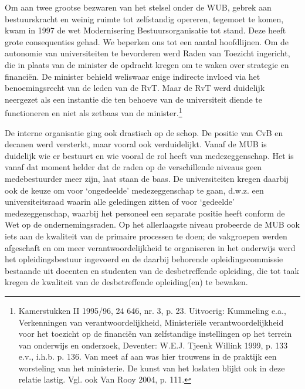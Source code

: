 \documentclass[smallauthor, chapterhaspagenum, nochapterinheader, pagenuminheader,  bigchapnum,medium2, tocpages,  garamond, titleinheader]{jote-book}
\begin{document}
	Om aan twee grootse bezwaren van het stelsel onder de WUB, gebrek aan bestuurskracht en weinig ruimte tot zelfstandig opereren, tegemoet te komen, kwam in 1997 de wet Modernisering Bestuursorganisatie tot stand. Deze heeft grote consequenties gehad. We beperken ons tot een aantal hoofdlijnen. Om de autonomie van universiteiten te bevorderen werd Raden van Toezicht ingericht, die in plaats van de minister de opdracht kregen om te waken over strategie en financiën. De minister behield weliswaar enige indirecte invloed via het benoemingsrecht van de leden van de RvT. Maar de RvT werd duidelijk neergezet als een instantie die ten behoeve van de universiteit diende te functioneren en niet als zetbaas van de minister.\footnote{Kamerstukken II 1995/96, 24 646, nr. 3, p. 23. Uitvoerig: Kummeling e.a., Verkenningen van verantwoordelijkheid, Ministeriële verantwoordelijkheid voor het toezicht op de financiën van zelfstandige instellingen op het terrein van onderwijs en onderzoek, Deventer: W.E.J. Tjeenk Willink 1999, p. 133 e.v., i.h.b. p. 136. Van meet af aan was hier trouwens in de praktijk een worsteling van het ministerie. De kunst van het loslaten blijkt ook in deze relatie lastig. Vgl. ook Van Rooy 2004, p. 111. }



	De interne organisatie ging ook drastisch op de schop. De positie van CvB en decanen werd versterkt, maar vooral ook verduidelijkt. Vanaf de MUB is duidelijk wie er bestuurt en wie vooral de rol heeft van medezeggenschap. Het is vanaf dat moment helder dat de raden op de verschillende niveaus geen medebestuurder meer zijn, laat staan de baas. De universiteiten kregen daarbij ook de keuze om voor ‘ongedeelde' medezeggenschap te gaan, d.w.z. een universiteitsraad waarin alle geledingen zitten of voor ‘gedeelde' medezeggenschap, waarbij het personeel een separate positie heeft conform de Wet op de ondernemingsraden. Op het allerlaagste niveau probeerde de MUB ook iets aan de kwaliteit van de primaire processen te doen; de vakgroepen werden afgeschaft en om meer verantwoordelijkheid te organiseren in het onderwijs werd het opleidingsbestuur ingevoerd en de daarbij behorende opleidingscommissie bestaande uit docenten en studenten van de desbetreffende opleiding, die tot taak kregen de kwaliteit van de desbetreffende opleiding(en) te bewaken.
\end{document}
